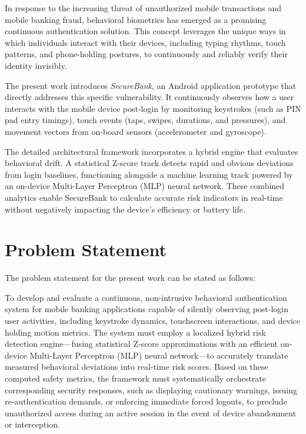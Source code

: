 \documentclass[12pt,a4paper]{report}
\begin{document}
In response to the increasing threat of unauthorized mobile transactions and mobile banking fraud, behavioral biometrics has emerged as a promising continuous authentication solution. This concept leverages the unique ways in which individuals interact with their devices, including typing rhythms, touch patterns, and phone-holding postures, to continuously and reliably verify their identity invisibly.

The present work introduces \textit{SecureBank}, an Android application prototype that directly addresses this specific vulnerability. It continuously observes how a user interacts with the mobile device post-login by monitoring keystrokes (such as PIN pad entry timings), touch events (taps, swipes, durations, and pressures), and movement vectors from on-board sensors (accelerometer and gyroscope). 

The detailed architectural framework incorporates a hybrid engine that evaluates behavioral drift. A statistical Z-score track detects rapid and obvious deviations from login baselines, functioning alongside a machine learning track powered by an on-device Multi-Layer Perceptron (MLP) neural network. These combined analytics enable SecureBank to calculate accurate risk indicators in real-time without negatively impacting the device’s efficiency or battery life.

\section{Problem Statement}

The problem statement for the present work can be stated as follows:

To develop and evaluate a continuous, non-intrusive behavioral authentication system for mobile banking applications capable of silently observing post-login user activities, including keystroke dynamics, touchscreen interactions, and device holding motion metrics. The system must employ a localized hybrid risk detection engine—fusing statistical Z-score approximations with an efficient on-device Multi-Layer Perceptron (MLP) neural network—to accurately translate measured behavioral deviations into real-time risk scores. Based on these computed safety metrics, the framework must systematically orchestrate corresponding security responses, such as displaying cautionary warnings, issuing re-authentication demands, or enforcing immediate forced logouts, to preclude unauthorized access during an active session in the event of device abandonment or interception.
\end{document}
